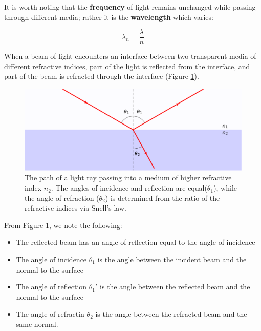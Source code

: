 \documentclass[
]{book}
\providecommand{\tightlist}{%
  \setlength{\itemsep}{0pt}\setlength{\parskip}{0pt}}
\begin{document}
It is worth noting that the \textbf{frequency} of light remains unchanged while passing through different media; rather it is the \textbf{wavelength} which varies:

\begin{equation}
\lambda_n = \frac{\lambda}{n}
\end{equation}

When a beam of light encounters an interface between two transparent media of different refractive indices, part of the light is reflected from the interface, and part of the beam is refracted through the interface (Figure \ref{fig:ch14-reflectionrefraction}).

\begin{figure}

{\centering \includegraphics[width=0.7\linewidth]{visualisations/LaTeX/ch14-reflection-refraction1} 

}

\caption{The path of a light ray passing into a medium of higher refractive index $n_2$. The angles of incidence and reflection are equal($\theta_1$), while the angle of refraction ($\theta_2$) is determined from the ratio of the refractive indices via Snell's law.}\label{fig:ch14-reflectionrefraction}
\end{figure}

From Figure \ref{fig:ch14-reflectionrefraction}, we note the following:

\begin{itemize}
\tightlist
\item
  The reflected beam has an angle of reflection equal to the angle of incidence
\item
  The angle of incidence \(\theta_1\) is the angle between the incident beam and the normal to the surface
\item
  The angle of reflection \(\theta_1'\) is the angle between the reflected beam and the normal to the surface
\item
  The angle of refractin \(\theta_2\) is the angle between the refracted beam and the same normal.
\end{itemize}
\end{document}
